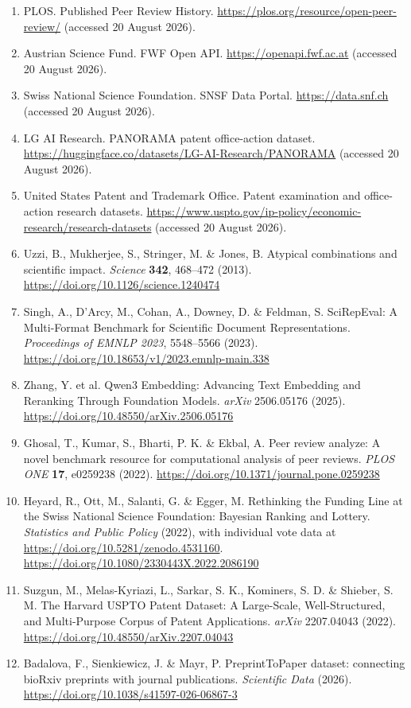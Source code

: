 \documentclass[
  10pt,
]{article}
\begin{document}
{\begin{enumerate}
  SciPost. Editorial procedure and public submissions.
  \url{https://scipost.org/submissions/} (accessed 20 August 2026).
\item
  PLOS. Published Peer Review History.
  \url{https://plos.org/resource/open-peer-review/} (accessed 20 August
  2026).
\item
  Austrian Science Fund. FWF Open API. \url{https://openapi.fwf.ac.at}
  (accessed 20 August 2026).
\item
  Swiss National Science Foundation. SNSF Data Portal.
  \url{https://data.snf.ch} (accessed 20 August 2026).
\item
  LG AI Research. PANORAMA patent office-action dataset.
  \url{https://huggingface.co/datasets/LG-AI-Research/PANORAMA}
  (accessed 20 August 2026).
\item
  United States Patent and Trademark Office. Patent examination and
  office-action research datasets.
  \url{https://www.uspto.gov/ip-policy/economic-research/research-datasets}
  (accessed 20 August 2026).
\item
  Uzzi, B., Mukherjee, S., Stringer, M. \& Jones, B. Atypical
  combinations and scientific impact. \emph{Science} \textbf{342},
  468--472 (2013). \url{https://doi.org/10.1126/science.1240474}
\item
  Singh, A., D'Arcy, M., Cohan, A., Downey, D. \& Feldman, S.
  SciRepEval: A Multi-Format Benchmark for Scientific Document
  Representations. \emph{Proceedings of EMNLP 2023}, 5548--5566 (2023).
  \url{https://doi.org/10.18653/v1/2023.emnlp-main.338}
\item
  Zhang, Y. et al. Qwen3 Embedding: Advancing Text Embedding and
  Reranking Through Foundation Models. \emph{arXiv} 2506.05176 (2025).
  \url{https://doi.org/10.48550/arXiv.2506.05176}
\item
  Ghosal, T., Kumar, S., Bharti, P. K. \& Ekbal, A. Peer review
  analyze: A novel benchmark resource for computational analysis of peer
  reviews. \emph{PLOS ONE} \textbf{17}, e0259238 (2022).
  \url{https://doi.org/10.1371/journal.pone.0259238}
\item
  Heyard, R., Ott, M., Salanti, G. \& Egger, M. Rethinking the Funding
  Line at the Swiss National Science Foundation: Bayesian Ranking and
  Lottery. \emph{Statistics and Public Policy} (2022), with individual
  vote data at \url{https://doi.org/10.5281/zenodo.4531160}.
  \url{https://doi.org/10.1080/2330443X.2022.2086190}
\item
  Suzgun, M., Melas-Kyriazi, L., Sarkar, S. K., Kominers, S. D. \&
  Shieber, S. M. The Harvard USPTO Patent Dataset: A Large-Scale,
  Well-Structured, and Multi-Purpose Corpus of Patent Applications.
  \emph{arXiv} 2207.04043 (2022).
  \url{https://doi.org/10.48550/arXiv.2207.04043}
\item
  Badalova, F., Sienkiewicz, J. \& Mayr, P. PreprintToPaper dataset:
  connecting bioRxiv preprints with journal publications.
  \emph{Scientific Data} (2026).
  \url{https://doi.org/10.1038/s41597-026-06867-3}
\end{enumerate}
}
\end{document}
